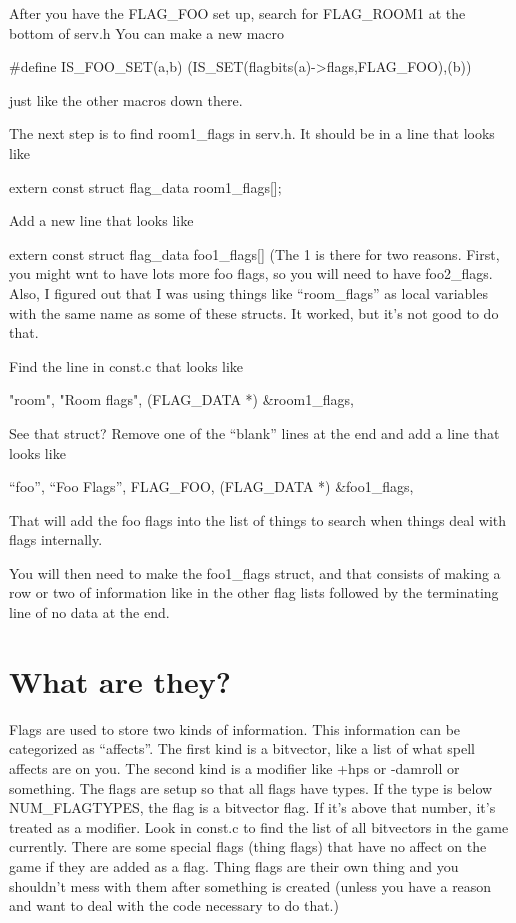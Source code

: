 After you have the FLAG\_FOO set up, search for FLAG\_ROOM1 at the
bottom of serv.h You can make a new macro 

\#define IS\_FOO\_SET(a,b)  (IS\_SET(flagbits(a)->flags,FLAG\_FOO),(b))

just like the other macros down there.

The next step is to find room1\_flags in serv.h. It should be in a line
that looks like

extern const struct flag\_data room1\_flags[];

Add a new line that looks like

extern const struct flag\_data foo1\_flags[] (The 1 is there for two
reasons. First, you might wnt to have lots more foo flags, so you will
need to have foo2\_flags. Also, I figured out that I was using
things like ``room\_flags'' as local variables with the same name
as some of these structs. It worked, but it's not good to do that.

Find the line in const.c that looks like

{"room", "Room flags", (FLAG\_DATA *) \&room1\_flags},

See that struct? Remove one of the ``blank'' lines at the end and
add a line that looks like

{``foo'', ``Foo Flags'', FLAG\_FOO, (FLAG\_DATA *) \&foo1\_flags},

That will add the foo flags into the list of things to search
when things deal with flags internally. 

You will then need to make the foo1\_flags struct, and that consists of
making a row or two of information like in the other flag lists followed
by the terminating line of no data at the end.



\section{What are they?}

Flags are used to store two kinds of information. This information can be
categorized as ``affects''. The first kind is a bitvector, like a list
of what spell affects are on you. The second kind is a modifier like
+hps or -damroll or something. The flags are setup so that all 
flags have types. If the type is below NUM\_FLAGTYPES, the flag is
a bitvector flag. If it's above that number, it's treated as a modifier.
Look in const.c to find the list of all bitvectors in the game currently.
There are some special flags (thing flags) that have no affect on
the game if they are added as a flag. Thing flags are their own
thing and you shouldn't mess with them after something is created 
(unless you have a reason and want to deal with the code necessary to do that.)

